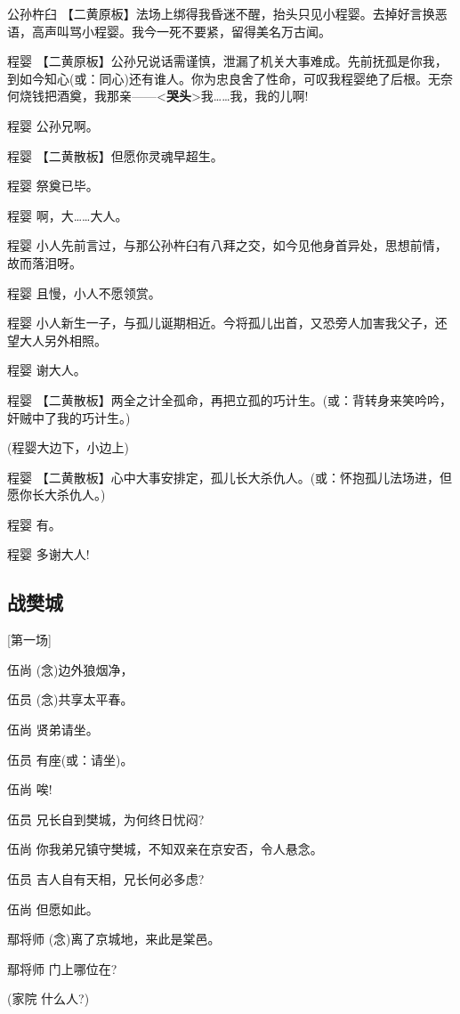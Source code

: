 公孙杵臼
【二黄原板】法场上绑得我昏迷不醒，抬头只见小程婴。去掉好言换恶语，高声叫骂小程婴。我今一死不要紧，留得美名万古闻。

程婴
【二黄原板】公孙兄说话需谨慎，泄漏了机关大事难成。先前抚孤是你我，到如今知心(或：同心)还有谁人。你为忠良舍了性命，可叹我程婴绝了后根。无奈何烧钱把酒奠，我那亲------\textless{}\textbf{哭头}\textgreater{}我\ldots{}\ldots{}我，我的儿啊!

程婴 公孙兄啊。

程婴 【二黄散板】但愿你灵魂早超生。

程婴 祭奠已毕。

程婴 啊，大\ldots{}\ldots{}大人。

程婴
小人先前言过，与那公孙杵臼有八拜之交，如今见他身首异处，思想前情，故而落泪呀。

程婴 且慢，小人不愿领赏。

程婴
小人新生一子，与孤儿诞期相近。今将孤儿出首，又恐旁人加害我父子，还望大人另外相照。

程婴 谢大人。

程婴
【二黄散板】两全之计全孤命，再把立孤的巧计生。(或：背转身来笑吟吟，奸贼中了我的巧计生。)

(程婴大边下，小边上)

程婴
【二黄散板】心中大事安排定，孤儿长大杀仇人。(或：怀抱孤儿法场进，但愿你长大杀仇人。)

程婴 有。

程婴 多谢大人!

\newpage
\hypertarget{ux6218ux6a0aux57ce}{%
\subsection{战樊城}\label{ux6218ux6a0aux57ce}}

{[}第一场{]}

伍尚 (念)边外狼烟净，

伍员 (念)共享太平春。

伍尚 贤弟请坐。

伍员 有座(或：请坐)。

伍尚 唉!

伍员 兄长自到樊城，为何终日忧闷?

伍尚 你我弟兄镇守樊城，不知双亲在京安否，令人悬念。

伍员 吉人自有天相，兄长何必多虑?

伍尚 但愿如此。

鄢将师 (念)离了京城地，来此是棠邑。

鄢将师 门上哪位在?

(家院 什么人?)

